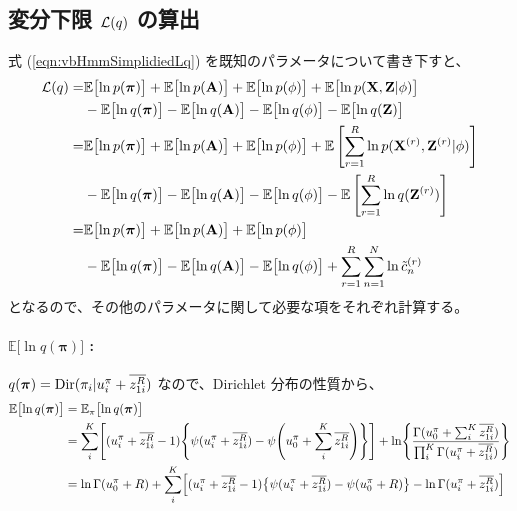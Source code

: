 \subsection{ 変分下限 ${\cal L}(q)$ の算出 }

式 (\ref{eqn:vbHmmSimplidiedLq}) を既知のパラメータについて書き下すと、
\begin{align}
  {\cal L}(q)  =&  \mathbb{E}\bigl[\ln p({\boldsymbol \pi}) \bigr] + \mathbb{E}\bigl[\ln p({\bf A}) \bigr] + \mathbb{E}\bigl[\ln p(\phi) \bigr] + \mathbb{E}\bigl[\ln p( {\bf X}, {\bf Z} | \phi) \bigr]  \notag  \\
  &  - \mathbb{E}\bigl[\ln q({\boldsymbol \pi}) \bigr] - \mathbb{E}\bigl[\ln q({\bf A}) \bigr] - \mathbb{E}\bigl[\ln q( \phi ) \bigr] - \mathbb{E}\bigl[\ln q( {\bf Z} ) \bigr]  \\
%
  =&  \mathbb{E}\bigl[\ln p({\boldsymbol \pi}) \bigr] + \mathbb{E}\bigl[\ln p({\bf A}) \bigr] + \mathbb{E}\bigl[\ln p(\phi) \bigr] + \mathbb{E}\left[\sum_{r=1}^R \ln p( {\bf X}^{(r)}, {\bf Z}^{(r)} | \phi) \right]  \notag  \\
    &  - \mathbb{E}\bigl[\ln q({\boldsymbol \pi}) \bigr] - \mathbb{E}\bigl[\ln q({\bf A}) \bigr] - \mathbb{E}\bigl[\ln q( \phi ) \bigr] - \mathbb{E}\left[\sum_{r=1}^R \ln q( {\bf Z}^{(r)} ) \right]  \\
%
 =&  \mathbb{E}\bigl[\ln p({\boldsymbol \pi}) \bigr] + \mathbb{E}\bigl[\ln p({\bf A}) \bigr] + \mathbb{E}\bigl[\ln p(\phi) \bigr]  \notag  \\  
    &  - \mathbb{E}\bigl[\ln q({\boldsymbol \pi}) \bigr] - \mathbb{E}\bigl[\ln q({\bf A}) \bigr] - \mathbb{E}\bigl[\ln q( \phi ) \bigr] + \sum_{r=1}^R \sum_{n=1}^N \ln \tilde{c}_n^{(r)}  %
\end{align}
となるので、その他のパラメータに関して必要な項をそれぞれ計算する。

\paragraph{ $\mathbb{E}\bigl[\ln q({\boldsymbol \pi}) \bigr]$ : }
$q({\boldsymbol \pi}) = {\rm Dir}(\pi_i|u_i^\pi + \overline{z_{1i}^R})$ なので、Dirichlet  分布の性質から、
\begin{align}
  \mathbb{E}\bigl[\ln q({\boldsymbol \pi}) \bigr]  &=  \mathbb{E}_{\pi}\bigl[ \ln q({\boldsymbol \pi}) \bigr]  \\
%
  &=  \sum_i^K \Biggl[ (u_i^\pi + \overline{z_{1i}^R} - 1) \Biggl\{ \psi(u_i^\pi + \overline{z_{1i}^R}) - \psi\Biggl(u_0^\pi + \sum_i^K \overline{z_{1i}^R}\Biggr) \Biggr\} \Biggr] + \ln \Biggl\{ \frac{ \Gamma(u_0^\pi + \sum_i^K \overline{z_{1i}^R}) }{ \prod_i^K \Gamma(u_i^\pi + \overline{z_{1i}^R}) } \Biggr\}  \\
%
  &= \ln \Gamma(u_0^\pi + R) + \sum_i^K \Bigl[ (u_i^\pi + \overline{z_{1i}^R} - 1) \bigl\{ \psi(u_i^\pi + \overline{z_{1i}^R}) - \psi(u_0^\pi + R) \bigr\} - \ln \Gamma(u_i^\pi + \overline{z_{1i}^R}) \Bigr]  %
\end{align}

